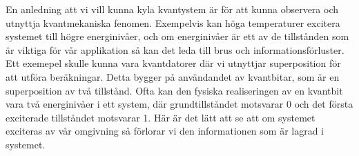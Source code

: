 En anledning att vi vill kunna kyla kvantystem är för att kunna observera och utnyttja kvantmekaniska fenomen. Exempelvis kan höga temperaturer excitera systemet till högre energinivåer, och om energinivåer är ett av de tillstånden som är viktiga för vår applikation så kan det leda till brus och informationsförluster. Ett exemepel skulle kunna vara kvantdatorer där vi utnyttjar superposition för att utföra beräkningar. Detta bygger på användandet av kvantbitar, som är en superposition av två tillstånd. Ofta kan den fysiska realiseringen av en kvantbit vara två energinivåer i ett system, där grundtillståndet motsvarar 0 och det första exciterade tillståndet motsvarar 1. Här är det lätt att se att om systemet exciteras av vår omgivning så förlorar vi den informationen som är lagrad i systemet.